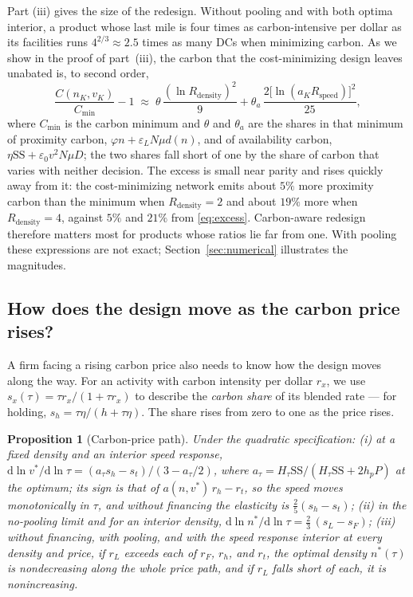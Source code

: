 \documentclass[11pt]{article}
\newtheorem{proposition}{Proposition}
\numberwithin{proposition}{section}
\theoremstyle{definition}
\theoremstyle{remark}
\theoremstyle{plain}
\newcommand{\sstock}{\mathrm{SS}}
\begin{document}
\noindent Part (iii) gives the size of the redesign. Without pooling and with both optima interior, a product
whose last mile is four times as carbon-intensive per dollar as its facilities runs $4^{2/3}\approx2.5$ times as
many DCs when minimizing carbon. As we show in the proof of part~(iii), the carbon that the cost-minimizing design leaves unabated is, to
second order,
\begin{equation}\label{eq:excess}
  \frac{C(n_K,v_K)}{C_{\min}}-1\;\approx\;\theta\,\frac{(\ln R_{\mathrm{density}})^2}{9}
  +\theta_a\,\frac{2\big[\ln(a_KR_{\mathrm{speed}})\big]^2}{25},
\end{equation}
where $C_{\min}$ is the carbon minimum and $\theta$ and $\theta_a$ are the shares in that minimum of proximity
carbon, $\varphi n+\varepsilon_LN\mu d(n)$, and of availability carbon, $\eta\sstock+\varepsilon_0v^2N\mu D$; the
two shares fall short of one by the share of carbon that varies with neither decision. The excess is small near parity and rises quickly away from it: the cost-minimizing network
emits about $5\%$ more proximity carbon than the minimum when $R_{\mathrm{density}}=2$ and about $19\%$ more when
$R_{\mathrm{density}}=4$, against $5\%$ and $21\%$ from \eqref{eq:excess}. Carbon-aware redesign therefore matters most for products whose ratios lie far from
one. With pooling these expressions are not exact;
Section~\ref{sec:numerical} illustrates the magnitudes.

\subsection{How does the design move as the carbon price rises?}\label{sec:path}

A firm facing a rising carbon price also needs to know how the design moves along the way. For an activity with
carbon intensity per dollar $r_x$, we use $s_x(\tau)=\tau r_x/(1+\tau r_x)$ to describe the \emph{carbon share}
of its blended rate --- for holding, $s_h=\tau\eta/(h+\tau\eta)$. The share rises from zero to one as the price
rises.

\begin{proposition}[Carbon-price path]\label{prop:path}
Under the quadratic specification:
\textup{(i)} at a fixed density and an interior speed response,
$\mathrm d\ln v^*/\mathrm d\ln\tau=(a_\tau s_h-s_t)/(3-a_\tau/2)$, where
$a_\tau=H_\tau\sstock/(H_\tau\sstock+2h_pP)$ at the optimum; its sign is that of $a(n,v^*)\,r_h-r_t$, so the
speed moves monotonically in $\tau$, and without financing the elasticity is $\tfrac25(s_h-s_t)$;
\textup{(ii)} in the no-pooling limit and for an interior density,
$\mathrm d\ln n^*/\mathrm d\ln\tau=\tfrac23\,(s_L-s_F)$;
\textup{(iii)} without financing, with pooling, and with the speed response interior at every density and price, if $r_L$ exceeds each of $r_F$, $r_h$, and
$r_t$, the optimal density $n^*(\tau)$ is nondecreasing along the whole price path, and if $r_L$ falls short of
each, it is nonincreasing.
\end{proposition}
\end{document}
